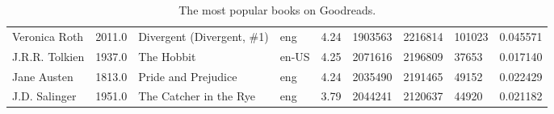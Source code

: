 \documentclass[11pt]{article}
\begin{document}
\begin{table}
\begin{tabular}{lHlHrHrHZ}
               Veronica Roth &                     2011.0 &                          Divergent (Divergent, \#1) &           eng &            4.24 &        1903563 &             2216814 &                   101023 &       0.045571 \\
              J.R.R. Tolkien &                     1937.0 &                                         The Hobbit &         en-US &            4.25 &        2071616 &             2196809 &                    37653 &       0.017140 \\
                 Jane Austen &                     1813.0 &                                Pride and Prejudice &           eng &            4.24 &        2035490 &             2191465 &                    49152 &       0.022429 \\
               J.D. Salinger &                     1951.0 &                             The Catcher in the Rye &           eng &            3.79 &        2044241 &             2120637 &                    44920 &       0.021182 \\
\bottomrule
\end{tabular}
    \caption[Most Rated Books]{The most popular books on Goodreads.}
     \label{tbl:most-rated-books}
\end{table}
        
%
%    
\end{document}
